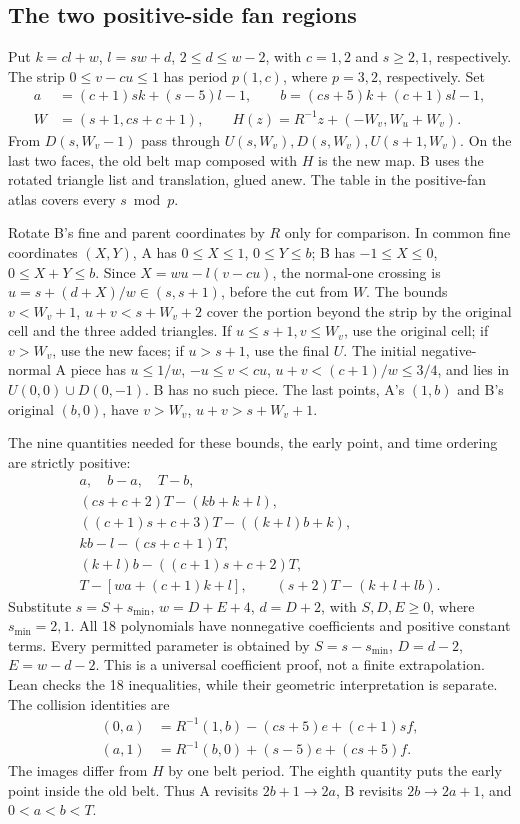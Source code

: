 \documentclass[11pt]{amsart}
\begin{document}
\subsection{The two positive-side fan regions}
Put $k=cl+w$, $l=sw+d$, $2\le d\le w-2$, with $c=1,2$ and
$s\ge2,1$, respectively. The strip $0\le v-cu\le1$ has period
$p(1,c)$, where $p=3,2$, respectively. Set
\[
\begin{split}
a&=(c+1)sk+(s-5)l-1,\qquad b=(cs+5)k+(c+1)sl-1,\\
W&=(s+1,cs+c+1),\qquad H(z)=R^{-1}z+(-W_v,W_u+W_v).
\end{split}
\]
From $D(s,W_v-1)$ pass through $U(s,W_v),D(s,W_v),U(s+1,W_v)$.
On the last two faces, the old belt map composed with $H$ is the new
map. B uses the rotated triangle list and translation, glued anew.
The table in the positive-fan atlas covers every $s\bmod p$.

Rotate B's fine and parent coordinates by $R$ only for comparison.
In common fine coordinates $(X,Y)$, A has $0\le X\le1$, $0\le Y\le b$;
B has $-1\le X\le0$, $0\le X+Y\le b$. Since
$X=wu-l(v-cu)$, the normal-one crossing is
$u=s+(d+X)/w\in(s,s+1)$, before the cut from $W$.
The bounds $v<W_v+1$, $u+v<s+W_v+2$ cover the portion beyond the
strip by the original cell and the three added triangles. If
$u\le s+1,v\le W_v$, use the original cell; if $v>W_v$, use the new
faces; if $u>s+1$, use the final $U$.
The initial negative-normal A piece has $u\le1/w$,
$-u\le v<cu$, $u+v<(c+1)/w\le3/4$, and lies in
$U(0,0)\cup D(0,-1)$. B has no such piece. The last points, A's
$(1,b)$ and B's original $(b,0)$, have $v>W_v$, $u+v>s+W_v+1$.

The nine quantities needed for these bounds, the early point, and
time ordering are strictly positive:
\begin{equation}\label{eq:8}
\begin{gathered}
a,\quad b-a,\quad T-b,\\
(cs+c+2)T-(kb+k+l),\\
((c+1)s+c+3)T-((k+l)b+k),\\
kb-l-(cs+c+1)T,\\
(k+l)b-((c+1)s+c+2)T,\\
T-[wa+(c+1)k+l],\qquad (s+2)T-(k+l+lb).
\end{gathered}\tag{8}
\end{equation}
Substitute $s=S+s_{\min}$, $w=D+E+4$, $d=D+2$, with
$S,D,E\ge0$, where $s_{\min}=2,1$. All 18 polynomials have
nonnegative coefficients and positive constant terms. Every permitted
parameter is obtained by $S=s-s_{\min}$, $D=d-2$, $E=w-d-2$.
This is a universal coefficient proof, not a finite extrapolation.
Lean checks the 18 inequalities, while their geometric interpretation
is separate. The collision identities are
\begin{equation}\label{eq:9}
\begin{aligned}
(0,a)&=R^{-1}(1,b)-(cs+5)e+(c+1)sf,\\
(a,1)&=R^{-1}(b,0)+(s-5)e+(cs+5)f.
\end{aligned}\tag{9}
\end{equation}
The images differ from $H$ by one belt period. The eighth quantity
puts the early point inside the old belt. Thus A revisits
$2b+1\to2a$, B revisits $2b\to2a+1$, and $0<a<b<T$.
\end{document}
